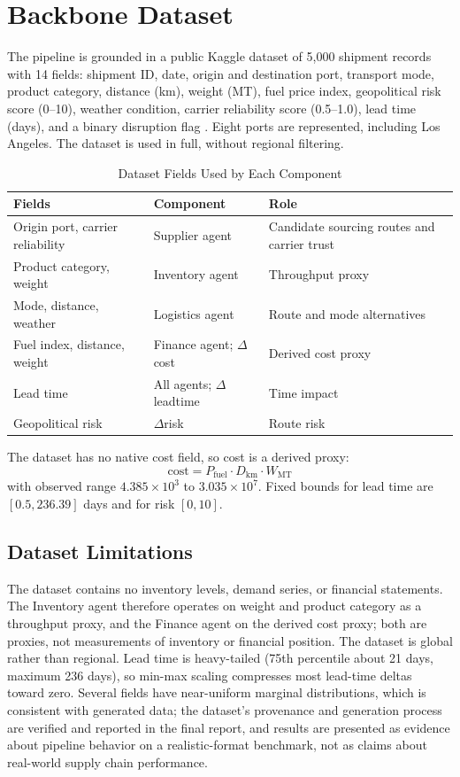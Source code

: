 \documentclass[conference]{IEEEtran}
\begin{document}
\section{Backbone Dataset}
\label{sec:data}
The pipeline is grounded in a public Kaggle dataset of 5,000 shipment records with 14 fields: shipment ID, date, origin and destination port, transport mode, product category, distance (km), weight (MT), fuel price index, geopolitical risk score (0--10), weather condition, carrier reliability score (0.5--1.0), lead time (days), and a binary disruption flag \cite{kaggle}. Eight ports are represented, including Los Angeles. The dataset is used in full, without regional filtering.

\begin{table}[h]
\centering
\caption{Dataset Fields Used by Each Component}
\footnotesize
\begin{tabular}{p{2.4cm}p{2.1cm}p{2.9cm}}
\toprule
\textbf{Fields} & \textbf{Component} & \textbf{Role} \\
\midrule
Origin port, carrier reliability & Supplier agent & Candidate sourcing routes and carrier trust \\
Product category, weight & Inventory agent & Throughput proxy \\
Mode, distance, weather & Logistics agent & Route and mode alternatives \\
Fuel index, distance, weight & Finance agent; $\Delta$cost & Derived cost proxy \\
Lead time & All agents; $\Delta$leadtime & Time impact \\
Geopolitical risk & $\Delta$risk & Route risk \\
\bottomrule
\end{tabular}
\end{table}

The dataset has no native cost field, so cost is a derived proxy:
\begin{equation}
\text{cost} = P_{\text{fuel}} \cdot D_{\text{km}} \cdot W_{\text{MT}}
\end{equation}
with observed range $4.385\times10^{3}$ to $3.035\times10^{7}$. Fixed bounds for lead time are $[0.5, 236.39]$ days and for risk $[0, 10]$.

\subsection{Dataset Limitations}
The dataset contains no inventory levels, demand series, or financial statements. The Inventory agent therefore operates on weight and product category as a throughput proxy, and the Finance agent on the derived cost proxy; both are proxies, not measurements of inventory or financial position. The dataset is global rather than regional. Lead time is heavy-tailed (75th percentile about 21 days, maximum 236 days), so min-max scaling compresses most lead-time deltas toward zero. Several fields have near-uniform marginal distributions, which is consistent with generated data; the dataset's provenance and generation process are verified and reported in the final report, and results are presented as evidence about pipeline behavior on a realistic-format benchmark, not as claims about real-world supply chain performance.
\end{document}

